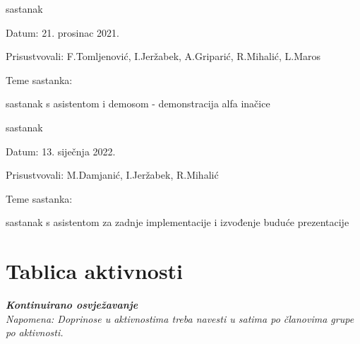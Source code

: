 \begin{packed_enum}
			\item  sastanak
			\item[] \begin{packed_item}
				\item Datum: 21. prosinac 2021. 
				\item Prisustvovali: F.Tomljenović, I.Jeržabek, A.Griparić, R.Mihalić, L.Maros
				\item Teme sastanka:
				\begin{packed_item}
					\item   sastanak s asistentom i demosom - demonstracija alfa inačice
				\end{packed_item}
			\end{packed_item}
		
			\item  sastanak
			\item[] \begin{packed_item}
				\item Datum: 13. siječnja 2022. 
				\item Prisustvovali: M.Damjanić, I.Jeržabek, R.Mihalić
				\item Teme sastanka:
				\begin{packed_item}
					\item  sastanak s asistentom za zadnje implementacije i izvođenje buduće prezentacije
				\end{packed_item}
			\end{packed_item}			
			
		\end{packed_enum}
		
		\eject
		\section*{Tablica aktivnosti}
		
			\textbf{\textit{Kontinuirano osvježavanje}}\\
			
			 \textit{Napomena: Doprinose u aktivnostima treba navesti u satima po članovima grupe po aktivnosti.}

